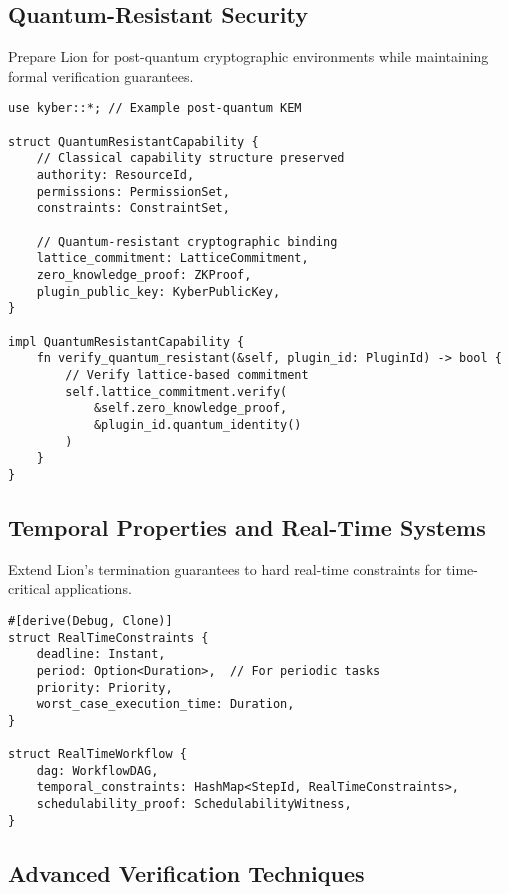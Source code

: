 \subsection{Quantum-Resistant Security}

Prepare Lion for post-quantum cryptographic environments while maintaining formal verification guarantees.

\begin{lstlisting}[style=rust,caption={Quantum-Resistant Capability Binding}]
use kyber::*; // Example post-quantum KEM

struct QuantumResistantCapability {
    // Classical capability structure preserved
    authority: ResourceId,
    permissions: PermissionSet,
    constraints: ConstraintSet,
    
    // Quantum-resistant cryptographic binding
    lattice_commitment: LatticeCommitment,
    zero_knowledge_proof: ZKProof,
    plugin_public_key: KyberPublicKey,
}

impl QuantumResistantCapability {
    fn verify_quantum_resistant(&self, plugin_id: PluginId) -> bool {
        // Verify lattice-based commitment
        self.lattice_commitment.verify(
            &self.zero_knowledge_proof,
            &plugin_id.quantum_identity()
        )
    }
}
\end{lstlisting}

\subsection{Temporal Properties and Real-Time Systems}

Extend Lion's termination guarantees to hard real-time constraints for time-critical applications.

\begin{lstlisting}[style=rust,caption={Real-Time Constraints}]
#[derive(Debug, Clone)]
struct RealTimeConstraints {
    deadline: Instant,
    period: Option<Duration>,  // For periodic tasks
    priority: Priority,
    worst_case_execution_time: Duration,
}

struct RealTimeWorkflow {
    dag: WorkflowDAG,
    temporal_constraints: HashMap<StepId, RealTimeConstraints>,
    schedulability_proof: SchedulabilityWitness,
}
\end{lstlisting}

\subsection{Advanced Verification Techniques}

